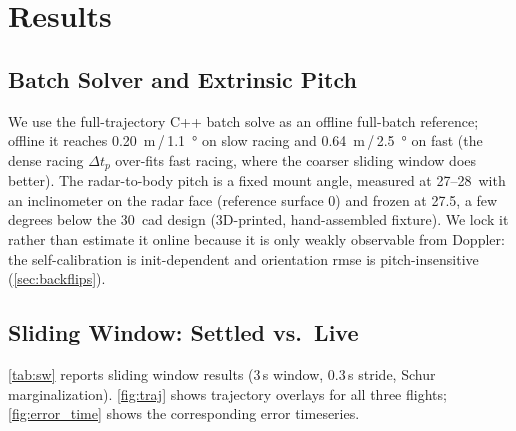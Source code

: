 \section{Results}
\label{sec:results}

\subsection{Batch Solver and Extrinsic Pitch}
We use the full-trajectory C++ batch solve as an offline full-batch
reference; offline it reaches
\SI{0.20}{\metre}\,/\,\SI{1.1}{\degree} on slow racing and
\SI{0.64}{\metre}\,/\,\SI{2.5}{\degree} on fast (the dense racing
$\Delta t_p$ over-fits fast racing, where the coarser sliding window
does better).
The radar-to-body pitch is a fixed mount angle, measured at
27--28\degree\ with an inclinometer on the radar face (reference surface
0\degree) and frozen at 27.5\degree, a few degrees below the
30\degree\ \ac{cad} design (3D-printed, hand-assembled fixture).  We lock it
rather than estimate it online because it is only weakly observable from
Doppler: the self-calibration is init-dependent and orientation \ac{rmse} is
pitch-insensitive (\autoref{sec:backflips}).

\subsection{Sliding Window: Settled vs.\ Live}
\label{sec:sw_results}

\autoref{tab:sw} reports sliding window results
(3\,s window, 0.3\,s stride, Schur marginalization).
\autoref{fig:traj} shows trajectory overlays for all three flights;
\autoref{fig:error_time} shows the corresponding error timeseries.

